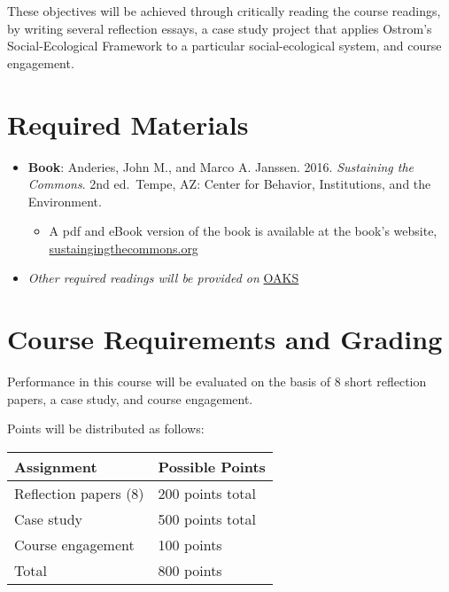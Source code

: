 \vspace{0.10in}

\noindent These objectives will be achieved through critically reading
the course readings, by writing several reflection essays, a case study
project that applies Ostrom's Social-Ecological Framework to a
particular social-ecological system, and course engagement.

\hypertarget{required-materials}{%
\section{Required Materials}\label{required-materials}}

\begin{itemize}

\item
  \textbf{Book}: Anderies, John M., and Marco A. Janssen. 2016.
  \emph{Sustaining the Commons}. 2nd ed.~Tempe, AZ: Center for Behavior,
  Institutions, and the Environment.

  \begin{itemize}
  
  \item
    A pdf and eBook version of the book is available at the book's
    website,
    \href{https://sustainingthecommons.org/}{sustaingingthecommons.org}
  \end{itemize}
\item
  \emph{Other required readings will be provided on}
  \href{https://lms.cofc.edu}{OAKS}
\end{itemize}

\hypertarget{course-requirements-and-grading}{%
\section{Course Requirements and
Grading}\label{course-requirements-and-grading}}

Performance in this course will be evaluated on the basis of 8 short
reflection papers, a case study, and course engagement.

\vspace{0.10in}

\noindent Points will be distributed as follows:

\begin{center}
\begin{tabular}{ l l}
\hline
Assignment & Possible Points \\ 
\hline
Reflection papers (8) & 200 points total \\
Case study & 500 points total \\
Course engagement & 100 points \\
\hline
Total &  800 points \\
\hline
\end{tabular}
\end{center}


